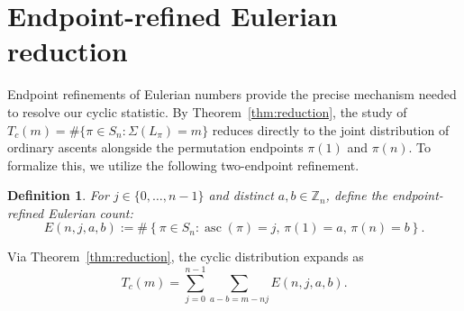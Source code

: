 \documentclass[11pt,a4paper]{amsart}
\newtheorem{definition}[theorem]{Definition}
\newcommand{\1}{\mathbf{1}}
\begin{document}
\section{Endpoint-refined Eulerian reduction}
Endpoint refinements of Eulerian numbers provide the precise mechanism needed to resolve our cyclic statistic. By Theorem~\ref{thm:reduction}, the study of $T_c(m) = \#\{\pi \in S_n : \Sigma(L_\pi)=m\}$ reduces directly to the joint distribution of ordinary ascents alongside the permutation endpoints $\pi(1)$ and $\pi(n)$. To formalize this, we utilize the following two-endpoint refinement.

\begin{definition}\label{def:E}
For $j \in \{0, \dots, n-1\}$ and distinct $a, b \in \mathbb{Z}_n$, define the endpoint-refined Eulerian count:
\[
E(n,j,a,b) := \#\left\{ \pi \in S_n : \operatorname{asc}(\pi) = j, \, \pi(1) = a, \, \pi(n) = b \right\}.
\]
\end{definition}

Via Theorem~\ref{thm:reduction}, the cyclic distribution expands as
\[
T_c(m) = \sum_{j=0}^{n-1} \sum_{a-b = m-nj} E(n,j,a,b).
\]
\end{document}
